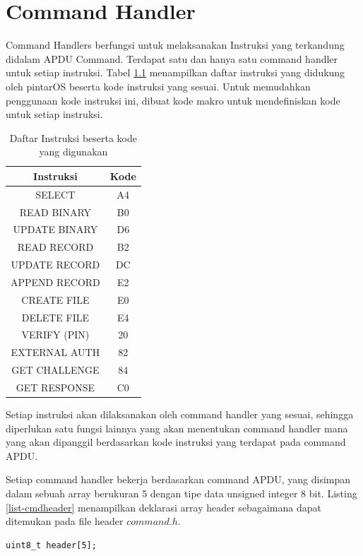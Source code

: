 \chapter{Command Handler}
\label{chap_command}

Command Handlers berfungsi untuk melaksanakan Instruksi yang terkandung didalam APDU Command. Terdapat satu dan hanya satu command handler untuk setiap instruksi. Tabel \ref{tabel-cmdlist} menampilkan daftar instruksi yang didukung oleh pintarOS beserta kode instruksi yang sesuai. Untuk memudahkan penggunaan kode instruksi ini, dibuat kode makro untuk mendefiniskan kode untuk setiap instruksi.

\begin{table}[h]
  \centering
  \begin{tabular}{|c|c|}
    \hline
    Instruksi & Kode \\
    \hline
    SELECT & A4 \\
    READ BINARY & B0 \\
    UPDATE BINARY & D6 \\
    READ RECORD & B2 \\
    UPDATE RECORD & DC \\
    APPEND RECORD & E2 \\
    CREATE FILE & E0 \\
    DELETE FILE & E4 \\
    VERIFY (PIN) & 20 \\
    EXTERNAL AUTH & 82 \\
    GET CHALLENGE & 84 \\
    GET RESPONSE & C0 \\
    \hline
  \end{tabular}
  \caption{Daftar Instruksi beserta kode yang digunakan}
  \label{tabel-cmdlist}
\end{table}

Setiap instruksi akan dilaksanakan oleh command handler yang sesuai, sehingga diperlukan satu fungsi lainnya yang akan menentukan command handler mana yang akan dipanggil berdasarkan kode instruksi yang terdapat pada command APDU. 

Setiap command handler bekerja berdasarkan command APDU, yang disimpan dalam sebuah array berukuran 5 dengan tipe data unsigned integer 8 bit. Listing \ref{list-cmdheader} menampilkan deklarasi array header sebagaimana dapat ditemukan pada file header $command.h$.

\begin{lstlisting}[caption={Deklarasi array header}, label={list-cmdheader}]
uint8_t header[5];
\end{lstlisting}

